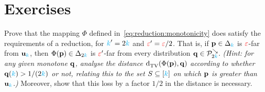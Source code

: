 \section{Exercises}
\begin{question}[$\star$]\label{ex:reduction:monotone}
  Prove that the mapping $\Phi$ defined in~\cref{eq:reduction:monotonicity} does satisfy the requirements of a reduction, for ${\textcolor{cyan}{k}}'=2{\textcolor{cyan}{k}}$ and $\textcolor{red}{\varepsilon}'=\textcolor{red}{\varepsilon}/2$. That is, if $\mathbf{p}\in\Delta_{{\textcolor{cyan}{k}}}$ is $\textcolor{red}{\varepsilon}$-far from $\mathbf{u}_{\textcolor{cyan}{k}}$, then $\Phi(\mathbf{p})\in\Delta_{2{\textcolor{cyan}{k}}}$ is $\textcolor{red}{\varepsilon}'$-far from every distribution $\mathbf{q}\in\mathcal{P}^{\searrow}_{2{\textcolor{cyan}{k}}}$. \textit{(Hint: for any given monotone $\mathbf{q}$, analyse the distance $\totalvardist{\Phi(\p)}{\q}$ according to whether $\mathbf{q}({\textcolor{cyan}{k}}) > 1/(2{\textcolor{cyan}{k}})$ or not, relating this to the set $S\subseteq[{\textcolor{cyan}{k}}]$ on which $\mathbf{p}$ is greater than $\mathbf{u}_{\textcolor{cyan}{k}}$.)} Moreover, show that this loss by a factor $1/2$ in the distance is necessary.
\end{question}
%
